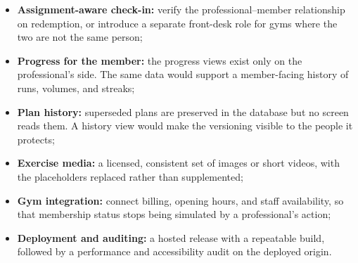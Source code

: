 \begin{itemize}[leftmargin=*,nosep]
    \item \textbf{Assignment-aware check-in:} verify the professional--member relationship on redemption, or introduce a separate front-desk role for gyms where the two are not the same person;
    \item \textbf{Progress for the member:} the progress views exist only on the professional's side. The same data would support a member-facing history of runs, volumes, and streaks;
    \item \textbf{Plan history:} superseded plans are preserved in the database but no screen reads them. A history view would make the versioning visible to the people it protects;
    \item \textbf{Exercise media:} a licensed, consistent set of images or short videos, with the placeholders replaced rather than supplemented;
    \item \textbf{Gym integration:} connect billing, opening hours, and staff availability, so that membership status stops being simulated by a professional's action;
    \item \textbf{Deployment and auditing:} a hosted release with a repeatable build, followed by a performance and accessibility audit on the deployed origin.
\end{itemize}
